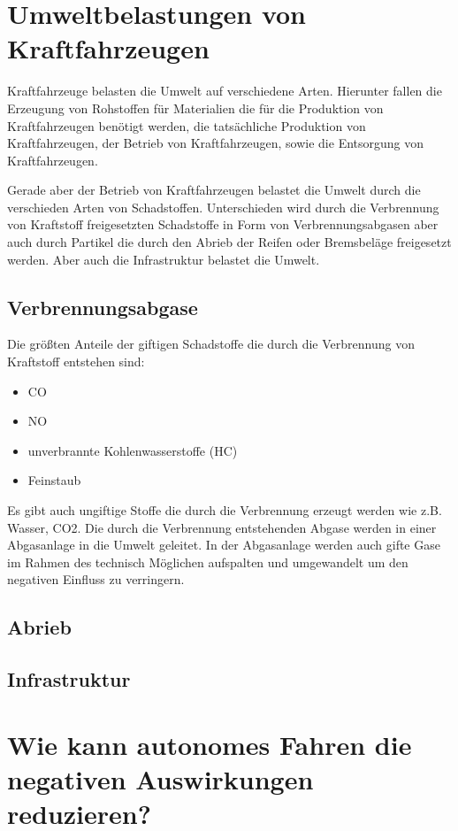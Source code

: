 \section{Umweltbelastungen von Kraftfahrzeugen}
Kraftfahrzeuge belasten die Umwelt auf verschiedene Arten. Hierunter fallen 
die Erzeugung von Rohstoffen für Materialien die für die Produktion von Kraftfahrzeugen benötigt werden, 
die tatsächliche Produktion von Kraftfahrzeugen,
der Betrieb von Kraftfahrzeugen,
sowie die Entsorgung von Kraftfahrzeugen.

Gerade aber der Betrieb von Kraftfahrzeugen belastet die Umwelt durch die verschieden Arten von Schadstoffen.
Unterschieden wird durch die Verbrennung von Kraftstoff freigesetzten Schadstoffe in Form von Verbrennungsabgasen aber auch durch Partikel die durch den Abrieb der Reifen oder Bremsbeläge freigesetzt werden.
Aber auch die Infrastruktur belastet die Umwelt.

\subsection{Verbrennungsabgase}
Die größten Anteile der giftigen Schadstoffe die durch die Verbrennung von Kraftstoff entstehen sind:
\begin{itemize}
	\item {\ac{CO}}
	\item {\ac{NO}}
	\item unverbrannte Kohlenwasserstoffe (HC)
	\item Feinstaub
\end{itemize}
Es gibt auch ungiftige Stoffe die durch die Verbrennung erzeugt werden wie z.B. Wasser, \ac{CO2}.
Die durch die Verbrennung entstehenden Abgase werden in einer Abgasanlage in die Umwelt geleitet.
In der Abgasanlage werden auch gifte Gase im Rahmen des technisch Möglichen aufspalten und umgewandelt um den negativen Einfluss zu verringern.

\subsection{Abrieb}

\subsection{Infrastruktur}



\section{Wie kann autonomes Fahren die negativen Auswirkungen reduzieren?}


